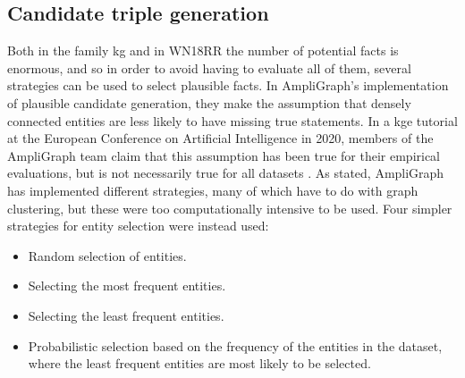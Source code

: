 \subsection{Candidate triple generation}
\label{canidate_triple_generation}
Both in the family \gls{kg} and in WN18RR the number of potential facts is enormous, and so in order to avoid having to evaluate all of them, several strategies can be used to select plausible facts. In AmpliGraph's implementation of plausible candidate generation, they make the assumption that densely connected entities are less likely to have missing true statements. In a \gls{kge} tutorial at the European Conference on Artificial Intelligence in 2020, members of the AmpliGraph team claim that this assumption has been true for their empirical evaluations, but is not necessarily true for all datasets \cite{kge_tutorial}.  As stated, AmpliGraph has implemented different strategies, many of which have to do with graph clustering, but these were too computationally intensive to be used. Four simpler strategies for entity selection were instead used:
\begin{itemize}
    \item Random selection of entities.
    \item Selecting the most frequent entities.
    \item Selecting the least frequent entities.
    \item Probabilistic selection based on the frequency of the entities in the dataset, where the least frequent entities are most likely to be selected.
\end{itemize}

